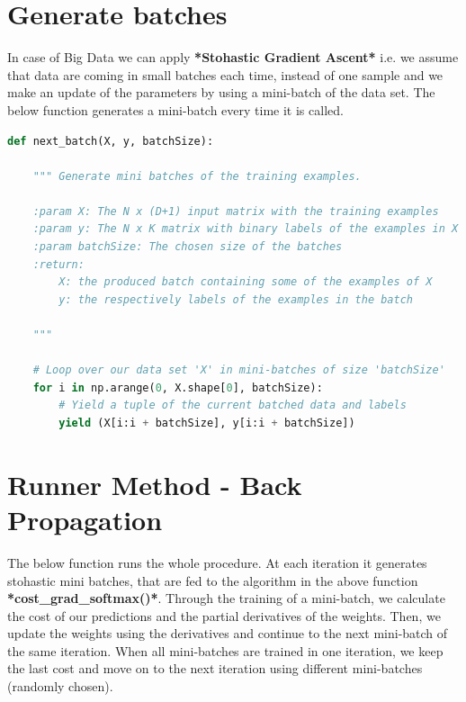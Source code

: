 \documentclass[11pt]{article}
\begin{document}
\newpage

\section{Generate batches}
In case of Big Data we can apply \textbf{*Stohastic Gradient Ascent*} i.e. we assume that data are coming in small batches each time, instead of one sample and we make an update of the parameters by using a mini-batch of the data set. The below function generates a mini-batch every time it is called. \\

\begin{lstlisting}[language = Python]
def next_batch(X, y, batchSize):
    
    """ Generate mini batches of the training examples.
    
    :param X: The N x (D+1) input matrix with the training examples
    :param y: The N x K matrix with binary labels of the examples in X indicating the 10 categories
    :param batchSize: The chosen size of the batches
    :return: 
        X: the produced batch containing some of the examples of X
        y: the respectively labels of the examples in the batch
        
    """
    
    # Loop over our data set 'X' in mini-batches of size 'batchSize'
    for i in np.arange(0, X.shape[0], batchSize):
        # Yield a tuple of the current batched data and labels
        yield (X[i:i + batchSize], y[i:i + batchSize])
\end{lstlisting}
\newpage

\section{Runner Method - Back Propagation}

The below function runs the whole procedure. At each iteration it generates stohastic mini batches, that are fed to the algorithm in the above function \textbf{*cost\_grad\_softmax()*}. Through the training of a mini-batch, we calculate the cost of our predictions and the partial derivatives of the weights. Then, we update the weights using the derivatives and continue to the next mini-batch of the same iteration. When all mini-batches are trained in one iteration, we keep the last cost and move on to the next iteration using different mini-batches (randomly chosen). \\
\end{document}
